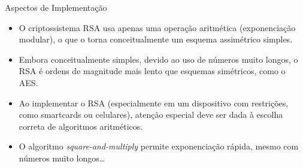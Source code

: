 \documentclass{beamer}
\begin{document}
\begin{frame}{Aspectos de Implementação}
    \begin{itemize}
        \item O criptossistema RSA usa apenas uma operação aritmética (exponenciação modular), o que o torna conceitualmente um esquema assimétrico simples.
        \vspace{0.5em}
        \item Embora conceitualmente simples, devido ao uso de números muito longos, o RSA é ordens de magnitude mais lento que esquemas simétricos, como o AES.
        \vspace{0.5em}
        \item Ao implementar o RSA (especialmente em um dispositivo com restrições, como smartcards ou celulares), atenção especial deve ser dada à escolha correta de algoritmos aritméticos.
        \vspace{0.5em}
        \item O algoritmo \color{blue}\textit{square-and-multiply}\color{black}$ $ permite exponenciação rápida, mesmo com números muito longos\dots
    \end{itemize}
\end{frame}
\end{document}
